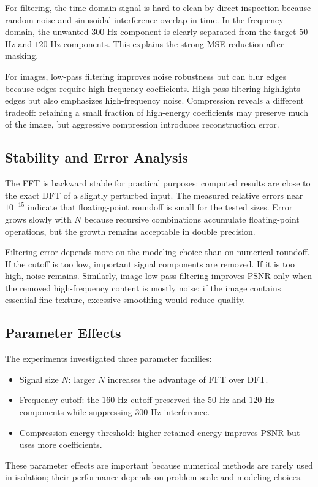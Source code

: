 \documentclass{zc-ust-hw}
\begin{document}
For filtering, the time-domain signal is hard to clean by direct inspection because random noise and sinusoidal interference overlap in time. In the frequency domain, the unwanted \(300\) Hz component is clearly separated from the target \(50\) Hz and \(120\) Hz components. This explains the strong MSE reduction after masking.

For images, low-pass filtering improves noise robustness but can blur edges because edges require high-frequency coefficients. High-pass filtering highlights edges but also emphasizes high-frequency noise. Compression reveals a different tradeoff: retaining a small fraction of high-energy coefficients may preserve much of the image, but aggressive compression introduces reconstruction error.

\subsection{Stability and Error Analysis}
The FFT is backward stable for practical purposes: computed results are close to the exact DFT of a slightly perturbed input. The measured relative errors near \(10^{-15}\) indicate that floating-point roundoff is small for the tested sizes. Error grows slowly with \(N\) because recursive combinations accumulate floating-point operations, but the growth remains acceptable in double precision.

Filtering error depends more on the modeling choice than on numerical roundoff. If the cutoff is too low, important signal components are removed. If it is too high, noise remains. Similarly, image low-pass filtering improves PSNR only when the removed high-frequency content is mostly noise; if the image contains essential fine texture, excessive smoothing would reduce quality.

\subsection{Parameter Effects}
The experiments investigated three parameter families:
\begin{itemize}
    \item Signal size \(N\): larger \(N\) increases the advantage of FFT over DFT.
    \item Frequency cutoff: the \(160\) Hz cutoff preserved the \(50\) Hz and \(120\) Hz components while suppressing \(300\) Hz interference.
    \item Compression energy threshold: higher retained energy improves PSNR but uses more coefficients.
\end{itemize}
These parameter effects are important because numerical methods are rarely used in isolation; their performance depends on problem scale and modeling choices.
\end{document}
